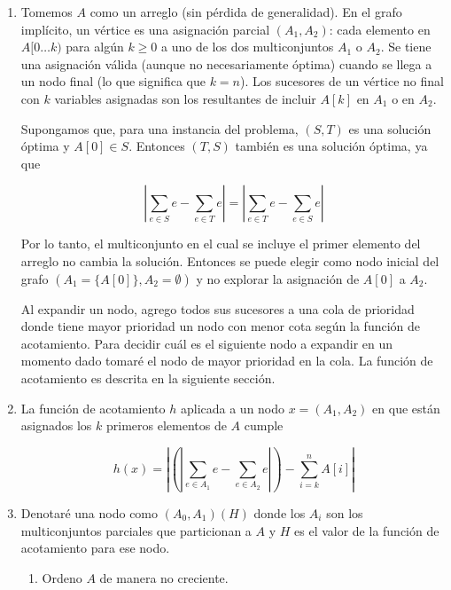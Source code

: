 \documentclass{article}
\begin{document}
\begin{enumerate}

 \item

Tomemos $A$ como un arreglo (sin pérdida de generalidad). En el grafo implícito, un vértice es
una asignación parcial $(A_1, A_2)$: cada elemento en $A[0 \ldots k)$ para algún $k \geq 0$ a uno de los dos multiconjuntos
$A_1$ o $A_2$.
Se tiene una asignación válida (aunque no necesariamente óptima) cuando se llega a un nodo final (lo que significa que $k = n$).
Los sucesores de un vértice no final con $k$ variables asignadas
son los resultantes de incluir $A[k]$ en $A_1$ o en $A_2$.

Supongamos que, para una instancia del problema, $(S, T)$ es una solución óptima
y $A[0] \in S$. Entonces $(T, S)$ también es una solución óptima, ya que

$$
\left|\sum_{e \in S} e - \sum_{e \in T} e\right| = \left|\sum_{e \in T} e - \sum_{e \in S} e\right|
$$

Por lo tanto, el multiconjunto en el cual se incluye el primer elemento del arreglo no cambia la solución.
Entonces se puede elegir como nodo inicial del grafo $(A_1 = \{A[0]\}, A_2 = \emptyset)$ y no explorar
la asignación de $A[0]$ a $A_2$.

Al expandir un nodo, agrego todos sus sucesores a una cola de prioridad donde tiene mayor prioridad un nodo
con menor cota según la función de acotamiento.
Para decidir cuál es el siguiente nodo a expandir en un momento dado tomaré el nodo de mayor prioridad
en la cola. La función de acotamiento es descrita en la siguiente sección.

 \item

La función de acotamiento $h$ aplicada a un nodo $x = (A_1, A_2)$ en que están asignados los $k$
primeros elementos de $A$ cumple 

$$
h(x) = \left| \left(\left|\sum_{e \in A_1} e - \sum_{e \in A_2} e\right|\right) - \sum_{i=k}^n A[i] \right|
$$

 \item

Denotaré una nodo como $(A_0,A_1) (H)$ donde los $A_i$ son los multiconjuntos parciales que particionan a
$A$ y $H$ es  el valor de la función de acotamiento para ese nodo.

\renewcommand{\labelenumii}{\arabic{enumii}.}

\begin{enumerate}
\item Ordeno $A$ de manera no creciente.


\end{enumerate}
\end{enumerate}
\end{document}
